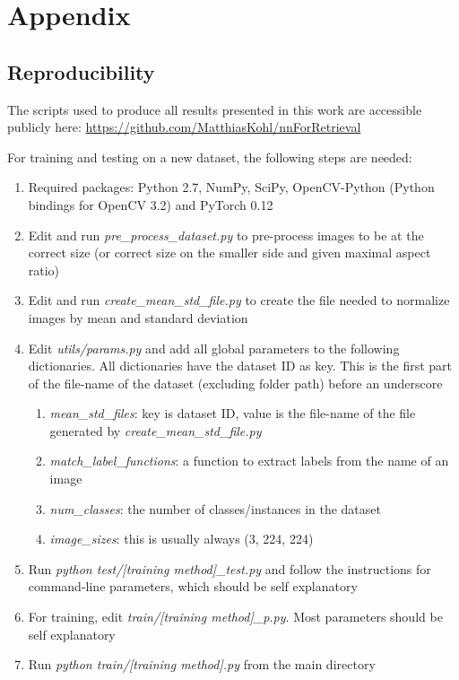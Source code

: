 
\appendix \chapter{Appendix}

\section{Reproducibility}
The scripts used to produce all results presented in this work are accessible
publicly here: \url{https://github.com/MatthiasKohl/nnForRetrieval}

For training and testing on a new dataset, the following steps are needed:

\begin{enumerate}
    \item Required packages: Python 2.7, NumPy, SciPy, OpenCV-Python
    (Python bindings for OpenCV 3.2) and PyTorch 0.12
    \item Edit and run \emph{pre\_process\_dataset.py} to pre-process
    images to be at the correct size (or correct size on the smaller
    side and given maximal aspect ratio)
    \item Edit and run \emph{create\_mean\_std\_file.py} to create the
    file needed to normalize images by mean and standard deviation
    \item Edit \emph{utils/params.py} and add all global parameters
    to the following dictionaries. All dictionaries have the dataset
    ID as key. This is the first part of the file-name of the dataset
    (excluding folder path) before an underscore
    \begin{enumerate}
        \item \emph{mean\_std\_files}: key is dataset ID, value is the file-name
        of the file generated by \emph{create\_mean\_std\_file.py}
        \item \emph{match\_label\_functions}: a function to extract labels
        from the name of an image
        \item \emph{num\_classes}: the number of classes/instances in the dataset
        \item \emph{image\_sizes}: this is usually always (3, 224, 224)
    \end{enumerate}
    \item Run \emph{python test/[training method]\_test.py} and follow
    the instructions for command-line parameters, which should be self
    explanatory
    \item For training, edit \emph{train/[training method]\_p.py}.
    Most parameters should be self explanatory
    \item Run \emph{python train/[training method].py} from the main
    directory
\end{enumerate}

